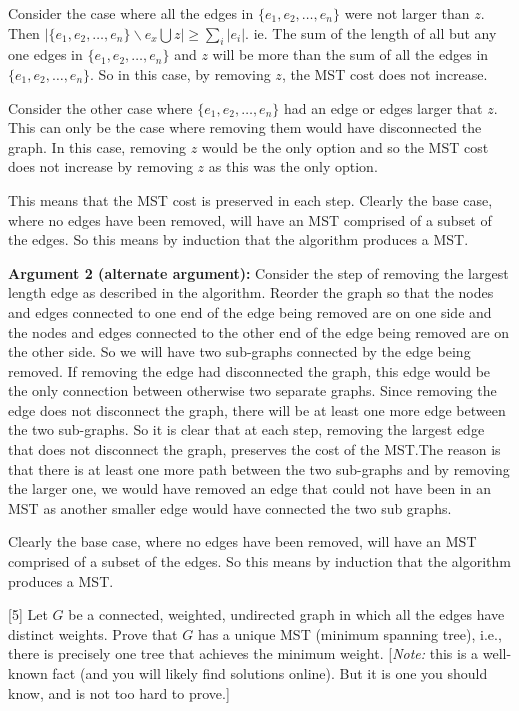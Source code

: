 \documentclass[addpoints]{exam}
\begin{document}
\begin{questions}
Consider the case where all the edges in $\{e_1,e_2,\ldots,e_n\}$ were not larger than $z$. Then $|\{e_1,e_2,\ldots,e_n\} \backslash e_x \bigcup z| \geq \sum_i| e_i|$. ie. The sum of the length of all but any one edges in $\{e_1,e_2,\ldots,e_n\}$ and $z$ will be more than the sum of all the edges in $\{e_1,e_2,\ldots,e_n\}$. So in this case, by removing $z$, the MST cost does not increase.

Consider the other case where $\{e_1,e_2,\ldots,e_n\}$ had an edge or edges larger that $z$. This can only be the case where removing them would have disconnected the graph. In this case, removing $z$ would be the only option and so the MST cost does not increase by removing $z$ as this was the only option.

This means that the MST cost is preserved in each step. Clearly the base case, where no edges have been removed, will have an MST comprised of a subset of the edges. So this means by induction that the algorithm produces a MST.

\textbf{Argument 2 (alternate argument):} Consider the step of removing the largest length edge as described in the algorithm. Reorder the graph so that the nodes and edges connected to one end of the edge being removed are on one side and the nodes and edges connected to the other end of the edge being removed are on the other side. So we will have two sub-graphs connected by the edge being removed. If removing the edge had disconnected the graph, this edge would be the only connection between otherwise two separate graphs. Since removing the edge does not disconnect the graph, there will be at least one more edge between the two sub-graphs. So it is clear that at each step, removing the largest edge that does not disconnect the graph, preserves the cost of the MST.The reason is that there is at least one more path between the two sub-graphs and by removing the larger one, we would have removed an edge that could not have been in an MST as another smaller edge would have connected the two sub graphs. 

Clearly the base case, where no edges have been removed, will have an MST comprised of a subset of the edges. So this means by induction that the algorithm produces a MST.

[5]
Let $G$ be a connected, weighted, undirected graph in which all the edges have distinct weights. Prove that $G$ has a unique MST (minimum spanning tree), i.e., there is precisely one tree that achieves the minimum weight.  [{\em Note:}  this is a well-known fact (and you will likely find solutions online). But it is one you should know, and is not too hard to prove.]


\end{questions}
\end{document}
